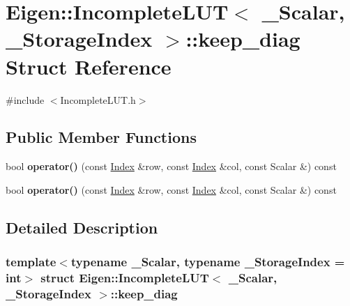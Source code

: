 \hypertarget{struct_eigen_1_1_incomplete_l_u_t_1_1keep__diag}{}\section{Eigen\+:\+:Incomplete\+L\+UT$<$ \+\_\+\+Scalar, \+\_\+\+Storage\+Index $>$\+:\+:keep\+\_\+diag Struct Reference}
\label{struct_eigen_1_1_incomplete_l_u_t_1_1keep__diag}


{\ttfamily \#include $<$Incomplete\+L\+U\+T.\+h$>$}

\subsection*{Public Member Functions}
\begin{DoxyCompactItemize}
\item 
\mbox{\label{struct_eigen_1_1_incomplete_l_u_t_1_1keep__diag_a6c2209490eaaacf837e4153f905def4b}} 
bool {\bfseries operator()} (const \hyperlink{namespace_eigen_a62e77e0933482dafde8fe197d9a2cfde}{Index} \&row, const \hyperlink{namespace_eigen_a62e77e0933482dafde8fe197d9a2cfde}{Index} \&col, const Scalar \&) const
\item 
\mbox{\label{struct_eigen_1_1_incomplete_l_u_t_1_1keep__diag_a6c2209490eaaacf837e4153f905def4b}} 
bool {\bfseries operator()} (const \hyperlink{namespace_eigen_a62e77e0933482dafde8fe197d9a2cfde}{Index} \&row, const \hyperlink{namespace_eigen_a62e77e0933482dafde8fe197d9a2cfde}{Index} \&col, const Scalar \&) const
\end{DoxyCompactItemize}


\subsection{Detailed Description}
\subsubsection*{template$<$typename \+\_\+\+Scalar, typename \+\_\+\+Storage\+Index = int$>$\newline
struct Eigen\+::\+Incomplete\+L\+U\+T$<$ \+\_\+\+Scalar, \+\_\+\+Storage\+Index $>$\+::keep\+\_\+diag}

